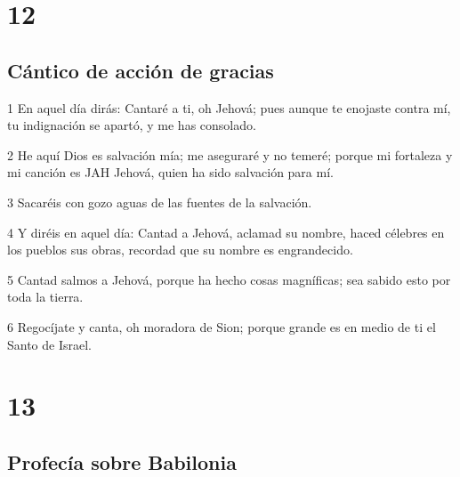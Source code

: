 \chapter{12}

\section*{Cántico de acción de gracias}

\par 1 En aquel día dirás: Cantaré a ti, oh Jehová; pues aunque te enojaste contra mí, tu indignación se apartó, y me has consolado.
\par 2 He aquí Dios es salvación mía; me aseguraré y no temeré; porque mi fortaleza y mi canción es JAH Jehová, quien ha sido salvación para mí.
\par 3 Sacaréis con gozo aguas de las fuentes de la salvación.
\par 4 Y diréis en aquel día: Cantad a Jehová, aclamad su nombre, haced célebres en los pueblos sus obras, recordad que su nombre es engrandecido.
\par 5 Cantad salmos a Jehová, porque ha hecho cosas magníficas; sea sabido esto por toda la tierra.
\par 6 Regocíjate y canta, oh moradora de Sion; porque grande es en medio de ti el Santo de Israel.

\chapter{13}

\section*{Profecía sobre Babilonia}

